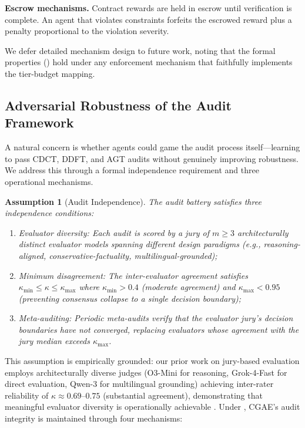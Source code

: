 \documentclass[11pt,a4paper]{article}
\newtheorem{assumption}{Assumption}
\begin{document}
\textbf{Escrow mechanisms.} Contract rewards are held in escrow until verification is complete. An agent that violates constraints forfeits the escrowed reward plus a penalty proportional to the violation severity.

We defer detailed mechanism design to future work, noting that the formal properties () hold under any enforcement mechanism that faithfully implements the tier-budget mapping.

\subsection{Adversarial Robustness of the Audit Framework}

A natural concern is whether agents could game the audit process itself---learning to pass CDCT, DDFT, and AGT audits without genuinely improving robustness. We address this through a formal independence requirement and three operational mechanisms.

\begin{assumption}[Audit Independence]
\label{asm:audit}
The audit battery satisfies three independence conditions:
\begin{enumerate}[nosep,label=(\alph*)]
  \item \emph{Evaluator diversity:} Each audit is scored by a jury of $m \geq 3$ architecturally distinct evaluator models spanning different design paradigms (e.g., reasoning-aligned, conservative-factuality, multilingual-grounded);
  \item \emph{Minimum disagreement:} The inter-evaluator agreement satisfies $\kappa_{\min} \leq \kappa \leq \kappa_{\max}$ where $\kappa_{\min} > 0.4$ (moderate agreement) and $\kappa_{\max} < 0.95$ (preventing consensus collapse to a single decision boundary);
  \item \emph{Meta-auditing:} Periodic meta-audits verify that the evaluator jury's decision boundaries have not converged, replacing evaluators whose agreement with the jury median exceeds $\kappa_{\max}$.
\end{enumerate}
\end{assumption}

This assumption is empirically grounded: our prior work on jury-based evaluation employs architecturally diverse judges (O3-Mini for reasoning, Grok-4-Fast for direct evaluation, Qwen-3 for multilingual grounding) achieving inter-rater reliability of $\kappa \approx 0.69$--$0.75$ (substantial agreement), demonstrating that meaningful evaluator diversity is operationally achievable \citep{baxi2025ddft,baxi2026agt}. Under , CGAE's audit integrity is maintained through four mechanisms:
\end{document}
